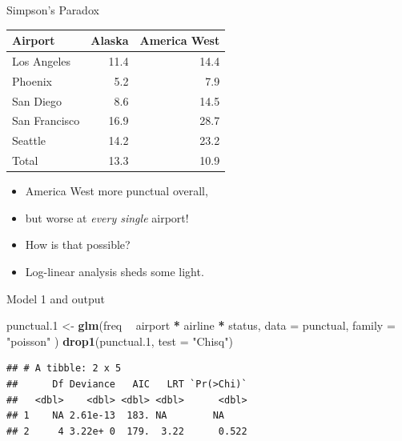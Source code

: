 \documentclass[
  ignorenonframetext,
]{beamer}
\newenvironment{Shaded}{\begin{snugshade}}{\end{snugshade}}
\newcommand{\DataTypeTok}[1]{\textcolor[rgb]{0.13,0.29,0.53}{#1}}
\newcommand{\FloatTok}[1]{\textcolor[rgb]{0.00,0.00,0.81}{#1}}
\newcommand{\KeywordTok}[1]{\textcolor[rgb]{0.13,0.29,0.53}{\textbf{#1}}}
\newcommand{\NormalTok}[1]{#1}
\newcommand{\OperatorTok}[1]{\textcolor[rgb]{0.81,0.36,0.00}{\textbf{#1}}}
\newcommand{\StringTok}[1]{\textcolor[rgb]{0.31,0.60,0.02}{#1}}
\begin{document}
\begin{frame}{Simpson's Paradox}
\protect\hypertarget{simpsons-paradox}{}

\begin{tabular}{|l|rr|}
\hline
Airport & Alaska & America West\\
\hline
Los Angeles & 11.4 & 14.4\\
Phoenix & 5.2 & 7.9\\
San Diego & 8.6 & 14.5\\
San Francisco & 16.9 & 28.7\\
Seattle & 14.2 & 23.2 \\
\hline
Total & 13.3 & 10.9 \\
\hline
\end{tabular}

\begin{itemize}
\item
  America West more punctual overall,
\item
  but worse at \emph{every single} airport!
\item
  How is that possible?
\item
  Log-linear analysis sheds some light.
\end{itemize}

\end{frame}

\begin{frame}[fragile]{Model 1 and output}
\protect\hypertarget{model-1-and-output}{}

\begin{Shaded}
\begin{Highlighting}[]
\NormalTok{punctual}\FloatTok{.1}\NormalTok{ <-}\StringTok{ }\KeywordTok{glm}\NormalTok{(freq }\OperatorTok{~}\StringTok{ }\NormalTok{airport }\OperatorTok{*}\StringTok{ }\NormalTok{airline }\OperatorTok{*}\StringTok{ }\NormalTok{status,}
  \DataTypeTok{data =}\NormalTok{ punctual, }\DataTypeTok{family =} \StringTok{"poisson"}
\NormalTok{)}
\KeywordTok{drop1}\NormalTok{(punctual}\FloatTok{.1}\NormalTok{, }\DataTypeTok{test =} \StringTok{"Chisq"}\NormalTok{)}
\end{Highlighting}
\end{Shaded}

\begin{verbatim}
## # A tibble: 2 x 5
##      Df Deviance   AIC   LRT `Pr(>Chi)`
##   <dbl>    <dbl> <dbl> <dbl>      <dbl>
## 1    NA 2.61e-13  183. NA        NA    
## 2     4 3.22e+ 0  179.  3.22      0.522
\end{verbatim}

\end{frame}
\end{document}
